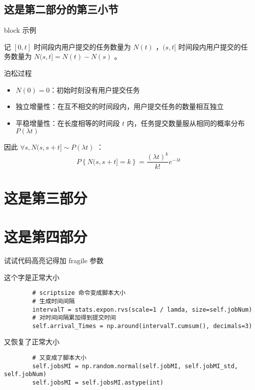 \documentclass[aspectratio=169]{beamer}
\begin{document}
\subsection{这是第二部分的第三小节}

\begin{frame}{block 示例}

  记 $[0,t]$ 时间段内用户提交的任务数量为 $N(t)$ ，$(s,t]$ 时间段内用户提交的任务数量为 $N(s,t] = N(t) - N(s)$ 。

  \begin{block}{泊松过程}
    \begin{itemize}
      \item $N(0)=0$：初始时刻没有用户提交任务
      \item 独立增量性：在互不相交的时间段内，用户提交任务的数量相互独立
      \item 平稳增量性：在长度相等的时间段 $t$ 内，任务提交数量服从相同的概率分布 $P(\lambda t)$
    \end{itemize}
  \end{block}

  因此 $\forall s, N(s,s+t] \sim P(\lambda t)$ ：
  $$P\left\{N(s,s+t]=k\right\} = \frac{(\lambda t)^k}{k!} e^{-\lambda t}$$

\end{frame}

\section{这是第三部分}



\section{这是第四部分}

\begin{frame}[fragile]{试试代码高亮}{记得加 fragile 参数}

  这个字是正常大小

  \scriptsize
  \begin{verbatim}
        # scriptsize 命令变成脚本大小
        # 生成时间间隔
        intervalT = stats.expon.rvs(scale=1 / lamda, size=self.jobNum)
        # 对时间间隔累加得到提交时间
        self.arrival_Times = np.around(intervalT.cumsum(), decimals=3)
  \end{verbatim}

  \normalsize
  又恢复了正常大小

  \scriptsize
  \begin{verbatim}
        # 又变成了脚本大小
        self.jobsMI = np.random.normal(self.jobMI, self.jobMI_std, self.jobNum)
        self.jobsMI = self.jobsMI.astype(int)
  \end{verbatim}

\end{frame}
\end{document}
